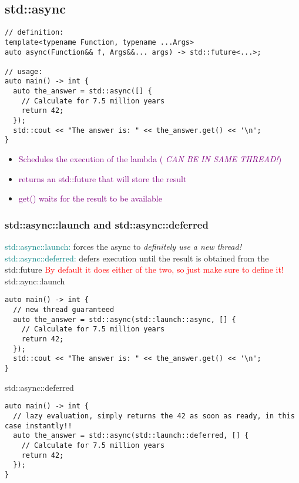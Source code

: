 \documentclass[main.tex,fontsize=8pt,paper=a4,paper=portrait,DIV=calc,]{scrartcl}
\begin{document}
\subsection{std::async}
\begin{lstlisting}
// definition:
template<typename Function, typename ...Args>
auto async(Function&& f, Args&&... args) -> std::future<...>;

// usage:
auto main() -> int {
  auto the_answer = std::async([] {
    // Calculate for 7.5 million years
    return 42;
  });
  std::cout << "The answer is: " << the_answer.get() << '\n';
}
\end{lstlisting}
\begin{itemize}
  \item \textcolor{purple}{Schedules the execution of the lambda ( \emph{CAN BE IN SAME THREAD!})}
\item \textcolor{purple}{returns an std::future that will store the result}
\item \textcolor{purple}{get() waits for the result to be available}
\end{itemize} 

\subsubsection{std::async::launch and std::async::deferred}
\textcolor{teal}{std::async::launch:} forces the async to \emph{definitely use a new thread!}\newline
\textcolor{teal}{std::async::deferred:} defers execution until the result is obtained from the std::future\newline
\textcolor{red}{By default it does either of the two, so just make sure to define it!}\newline
std::aync::launch
\begin{lstlisting}
auto main() -> int {
  // new thread guaranteed
  auto the_answer = std::async(std::launch::async, [] {
    // Calculate for 7.5 million years
    return 42;
  });
  std::cout << "The answer is: " << the_answer.get() << '\n';
}
\end{lstlisting}
std::async::deferred
\begin{lstlisting}
auto main() -> int {
  // lazy evaluation, simply returns the 42 as soon as ready, in this case instantly!!
  auto the_answer = std::async(std::launch::deferred, [] {
    // Calculate for 7.5 million years
    return 42;
  });
}
\end{lstlisting}
\end{document}
